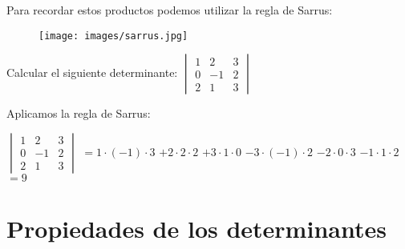 Para recordar estos productos podemos utilizar la regla de Sarrus:

\begin{figure}[h]
\centering
\texttt{[image: images/sarrus.jpg]}
\end{figure}


\begin{ejemplo}
Calcular el siguiente determinante:
$\begin{vmatrix}1&2&3\\
0&-1&2\\
2&1&3
\end{vmatrix}$

\tcblower
Aplicamos la regla de Sarrus:

$\begin{vmatrix}1&2&3\\
0&-1&2\\
2&1&3
\end{vmatrix}$ $=1\cdot (-1) \cdot 3$ $ +2\cdot 2 \cdot 2$ $+ 3\cdot 1 \cdot 0 $  $-3\cdot (-1)\cdot 2 $ $- 2\cdot 0\cdot 3 $ $- 1\cdot 1 \cdot 2$ $=9$

\end{ejemplo}

\section{Propiedades de los determinantes}

